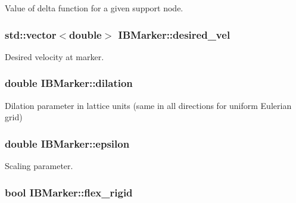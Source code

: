 Value of delta function for a given support node. 

\subsubsection[{\texorpdfstring{desired\+\_\+vel}{desired_vel}}]{\setlength{\rightskip}{0pt plus 5cm}std\+::vector$<$double$>$ I\+B\+Marker\+::desired\+\_\+vel\hspace{0.3cm}{\ttfamily [protected]}}\hypertarget{class_i_b_marker_ad9535b494684533ace9a9523c4df26bf}{}\label{class_i_b_marker_ad9535b494684533ace9a9523c4df26bf}


Desired velocity at marker. 

\subsubsection[{\texorpdfstring{dilation}{dilation}}]{\setlength{\rightskip}{0pt plus 5cm}double I\+B\+Marker\+::dilation\hspace{0.3cm}{\ttfamily [protected]}}\hypertarget{class_i_b_marker_a5c908a7e52fc0b2dccbaa277f37b7c22}{}\label{class_i_b_marker_a5c908a7e52fc0b2dccbaa277f37b7c22}


Dilation parameter in lattice units (same in all directions for uniform Eulerian grid) 

\subsubsection[{\texorpdfstring{epsilon}{epsilon}}]{\setlength{\rightskip}{0pt plus 5cm}double I\+B\+Marker\+::epsilon\hspace{0.3cm}{\ttfamily [protected]}}\hypertarget{class_i_b_marker_a8127c61f723299ba0bf04439c1fb1c1e}{}\label{class_i_b_marker_a8127c61f723299ba0bf04439c1fb1c1e}


Scaling parameter. 

\subsubsection[{\texorpdfstring{flex\+\_\+rigid}{flex_rigid}}]{\setlength{\rightskip}{0pt plus 5cm}bool I\+B\+Marker\+::flex\+\_\+rigid\hspace{0.3cm}{\ttfamily [protected]}}\hypertarget{class_i_b_marker_a826fd907814ce9c6e40bcbdbd359ec7e}{}\label{class_i_b_marker_a826fd907814ce9c6e40bcbdbd359ec7e}


